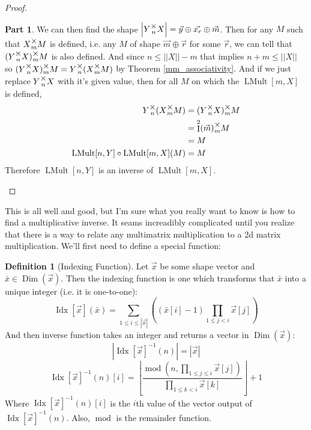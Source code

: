 \documentclass[12pt]{book}
\theoremstyle{plain}
\theoremstyle{definition}
\newtheorem{definition}{Definition}[chapter]
\theoremstyle{ppart}
\newtheorem{ppart}{Part}
\theoremstyle{case}
\theoremstyle{solution}
\DeclareMathOperator{\Dim}{Dim}
\DeclareMathOperator{\Ident}{I}
\DeclareMathOperator{\remainder}{mod}
\DeclareMathOperator{\LMult}{LMult}
\DeclareMathOperator{\Idx}{Idx}
\newcommand{\mmult}[1]{\text{\raisebox{1ex}{$\underset{#1}{\times}$}}}
\newcommand{\shape}[1]{\left|#1\right|}
\begin{document}
\begin{proof}
\begin{ppart}
We can then find the shape $\shape{Y \mmult{n} X} = \vec{y} \oplus \vec{x_r} \oplus \vec{m}$.
Then for any $M$ such that $X \mmult{m} M$ is defined, i.e. any $M$ of shape $\vec{m} \oplus \vec{r}$ for some $\vec{r}$,
we can tell that $(Y \mmult{n} X) \mmult{m} M$ is also defined.
And since $n \le \shape{\shape{X}}-m$ that implies $n+m \le \shape{\shape{X}}$ so $(Y \mmult{n} X) \mmult{m} M = Y \mmult{n} (X \mmult{m} M)$
by Theorem \ref{mm_associativity}.
And if we just replace $Y \mmult{n} X$ with it's given value, then for all $M$ on which the $\LMult[m,X]$ is defined,
\begin{align*}
  Y \mmult{n} (X \mmult{m} M) &= (Y \mmult{n} X) \mmult{m} M  \\
  &= \Ident^2(\vec{m}) \mmult{m} M\\
  &= M \\
  \LMult[n,Y] \circ \LMult[m,X](M) &= M
\end{align*}
Therefore $\LMult[n,Y]$ is an inverse of $\LMult[m,X]$.
\end{ppart}
\end{proof}
 
This is all well and good, but I'm sure what you really want to know is how to find a multiplicative inverse.
It seams increadibly complicated until you realize that there is a way to relate any multimatrix multiplication
to a 2d matrix multiplication. We'll first need to define a special function:

\begin{definition}[Indexing Function]
Let $\vec{x}$ be some shape vector and $\bar{x} \in \Dim(\vec{x})$. Then the indexing function is one which transforms
that $\bar{x}$ into a unique integer (i.e. it is one-to-one):
\[
  \Idx[\vec{x}](\bar{x}) = \sum_{1 \le i \le \shape{\vec{x}}} \left( (\bar{x}[i]-1) \prod_{1 \le j < i} \vec{x}[j] \right)
\]
And then inverse function takes an integer and returns a vector in $\Dim(\vec{x})$:
\[ \shape{\Idx[\vec{x}]^{-1}(n)} = \shape{\vec{x}} \]
\[
  \Idx[\vec{x}]^{-1}(n)[i] =
    \left\lfloor
      \frac{\remainder\left(n, \prod_{1 \le j \le i} \vec{x}[j]\right)}
      {\prod_{1 \le k < i} \vec{x}[k]}
    \right\rfloor + 1
\]
Where $\Idx[\vec{x}]^{-1}(n)[i]$ is the $i$th value of the vector output of $\Idx[\vec{x}]^{-1}(n)$.
Also, $\remainder$ is the remainder function.
\end{definition}
\end{document}
